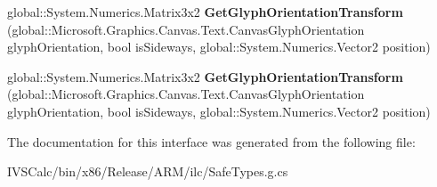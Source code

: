 \begin{DoxyCompactItemize}
\mbox{\label{interface_microsoft_1_1_graphics_1_1_canvas_1_1_text_1_1_i_canvas_text_layout_statics_a4a06f4eb221890b84f41e24f6c356933}} 
global\+::\+System.\+Numerics.\+Matrix3x2 {\bfseries Get\+Glyph\+Orientation\+Transform} (global\+::\+Microsoft.\+Graphics.\+Canvas.\+Text.\+Canvas\+Glyph\+Orientation glyph\+Orientation, bool is\+Sideways, global\+::\+System.\+Numerics.\+Vector2 position)
\item 
\mbox{\label{interface_microsoft_1_1_graphics_1_1_canvas_1_1_text_1_1_i_canvas_text_layout_statics_a4a06f4eb221890b84f41e24f6c356933}} 
global\+::\+System.\+Numerics.\+Matrix3x2 {\bfseries Get\+Glyph\+Orientation\+Transform} (global\+::\+Microsoft.\+Graphics.\+Canvas.\+Text.\+Canvas\+Glyph\+Orientation glyph\+Orientation, bool is\+Sideways, global\+::\+System.\+Numerics.\+Vector2 position)
\end{DoxyCompactItemize}


The documentation for this interface was generated from the following file\+:\begin{DoxyCompactItemize}
\item 
I\+V\+S\+Calc/bin/x86/\+Release/\+A\+R\+M/ilc/Safe\+Types.\+g.\+cs\end{DoxyCompactItemize}
